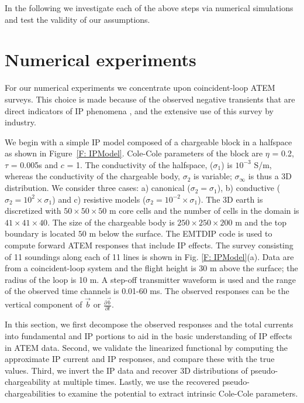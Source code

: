\documentclass[extra,mreferee]{gji}
\newcommand{\siginf}{\sigma_\infty}
\renewcommand {\b}  { {\vec b} }
\begin{document}
In the following we investigate each of the above steps via numerical simulations and test the validity of our assumptions.


\section{Numerical experiments}
\label{section: numerical_examples}
For our numerical experiments we concentrate upon coincident-loop ATEM surveys. This choice is made because of the observed negative transients that are direct indicators of IP phenomena \cite[]{SmithandKlein,Kratzer2012,Kang2015a}, and the extensive use of this survey by industry.

We begin with a simple IP model composed of a chargeable block in a halfspace as shown in Figure~\ref{F: IPModel}.
Cole-Cole parameters of the block are  $\eta$ = 0.2, $\tau$ = 0.005s and $c$ = 1.
The conductivity  of the halfspace, ($\sigma_1$) is  $10^{-3}$ S/m, whereas the conductivity of the chargeable body, $\sigma_2$ is variable;  $\siginf$ is thus a 3D distribution.
We consider three cases: a) canonical ($\sigma_2=\sigma_1$), b) conductive ($\sigma_2=10^2\times\sigma_1$) and c) resistive models ($\sigma_2=10^{-2}\times\sigma_1$).
The 3D earth is discretized with  $50\times50\times50$ m core cells and the number of cells in the domain is $41\times41\times40$.
The size of the chargeable body is $250\times250\times200$ m and the top boundary is located  $50$ m below the surface.
The EMTDIP code \cite[]{Marchant2014} is used to compute forward ATEM responses that include IP effects. The survey consisting of 11 soundings along each of 11 lines is shown in Fig. \ref{F: IPModel}(a).
Data are from a  coincident-loop system and the flight height is 30 m above the surface; the radius of the loop is 10 m.
A step-off transmitter waveform is used and the range of the observed time channels is 0.01-60 ms. The observed responses can be the vertical component of $\b$ or $\frac{\partial \b}{\partial t}$.

In this section, we first decompose the observed responses and the total currents into fundamental and IP portions to aid in the basic understanding of IP effects in ATEM data.
Second, we validate the linearized functional by computing the approximate IP current and IP responses, and compare these  with the true values.
Third, we invert the IP data and recover 3D distributions of pseudo-chargeability at multiple times.  Lastly, we use the recovered pseudo-chargeabilities to examine the potential to extract intrinsic Cole-Cole parameters.
\end{document}
